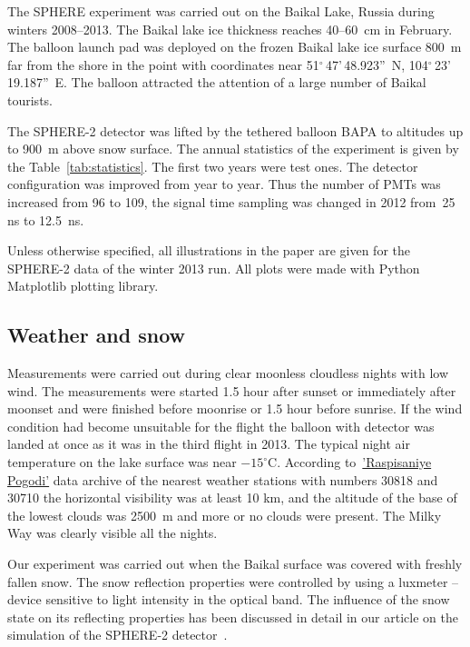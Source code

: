 \documentclass[final,5p,times,twocolumn]{elsarticle}
\begin{document}
The SPHERE experiment was carried out on the Baikal Lake, Russia during winters 2008--2013. The Baikal lake ice thickness reaches 40--60~cm in February. The balloon launch pad was deployed on the frozen Baikal lake ice surface 800~m far from the shore in the point with coordinates near 51$^\circ$\,47'\,48.923''~N, 104$^\circ$\,23'\,19.187''~E. 
The balloon attracted the attention of a large number of Baikal tourists. 

The \mbox{SPHERE-2} detector was lifted by the tethered balloon BAPA to altitudes up to 900~m above snow surface. The annual statistics of the experiment is given by the Table~\ref{tab:statistics}. The first two years were test ones. The detector configuration was improved from year to year. Thus the number of PMTs was increased from 96 to 109, the signal time sampling was changed in 2012 from~25 ns to 12.5~ns.

Unless otherwise specified, all illustrations in the paper are given for the \mbox{SPHERE-2} data of the winter 2013 run. All plots were made with Python Matplotlib plotting library.


\subsection{Weather and snow}

Measurements were carried out during clear moonless cloudless nights with low wind. The measurements were started 1.5 hour after sunset or immediately after moonset and were finished before moonrise or 1.5 hour before sunrise. If the wind condition had become unsuitable for the flight the balloon with detector was landed at once as it was in the third flight in 2013. The typical night air temperature on the lake surface was near $-15^\circ$C. According to~\href{https://rp5.ru/}{'Raspisaniye Pogodi'} data archive of the nearest weather stations with numbers 30818 and 30710 the horizontal visibility was at least 10 km, and the altitude of the base of the lowest clouds was 2500~m and more or no clouds were present. The Milky Way was clearly visible all the nights.

Our experiment was carried out when the Baikal surface was covered with freshly fallen snow. The snow reflection properties were controlled by using a luxmeter -- device sensitive to light intensity in the optical band. The influence of the snow state on its reflecting properties has been discussed in detail in our article on the simulation of the SPHERE-2 detector~\cite{Ant19}. 
\end{document}
